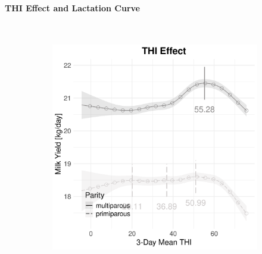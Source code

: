 \newpage
\paragraph{THI Effect and Lactation Curve} \quad \\
\begin{figure}[H]
    \centering
    \begin{subfigure}[b]{0.45\textwidth}
        \centering
        \includegraphics[width=\textwidth]{thesis/figures/models/milk/full/si_milk_full/si_milk_full_marginal_thi_milk_combined.png}
    \end{subfigure}
    \hspace{0.05\textwidth} %
    \begin{subfigure}[b]{0.45\textwidth}
        \centering

\end{subfigure}
\end{figure}
